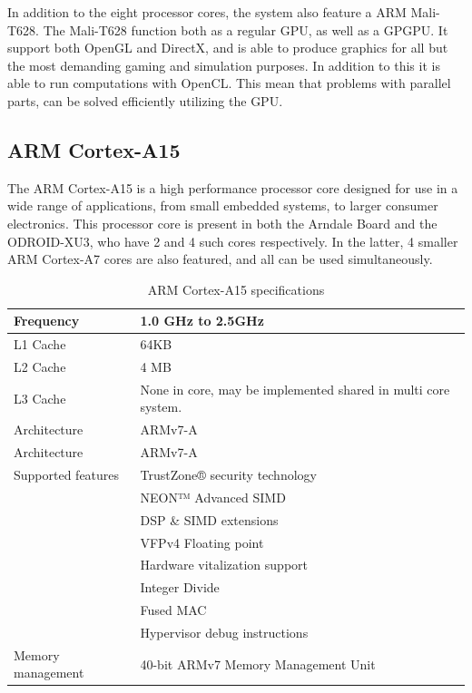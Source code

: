 In addition to the eight processor cores, the system also feature a ARM Mali-T628.
The Mali-T628 function both as a regular GPU, as well as a GPGPU.
It support both OpenGL and DirectX, and is able to produce graphics for all but the most demanding gaming and simulation purposes.
In addition to this it is able to run computations with OpenCL.
This mean that problems with parallel parts, can be solved efficiently utilizing the GPU.

\subsection{ARM Cortex-A15}
The ARM Cortex-A15 is a high performance processor core designed for use in a wide range of applications, from small embedded systems, to larger consumer electronics.
This processor core is present in both the Arndale Board and the ODROID-XU3, who have 2 and 4 such cores respectively.
In the latter, 4 smaller ARM Cortex-A7 cores are also featured, and all can be used simultaneously.
\begin{table}[H]
  \begin{tabular}{ll}
    \toprule
    Frequency         & 1.0 GHz to 2.5GHz  \\
    \midrule
    L1 Cache          & 64KB \\
    L2 Cache          & 4 MB \\
    L3 Cache          & None in core, may be implemented shared in multi core system. \\Architecture      & ARMv7-A            \\
    \midrule
    Architecture      & ARMv7-A            \\
    \midrule
    Supported features& TrustZone® security technology \\
                      & NEON™ Advanced SIMD \\
                      & DSP \& SIMD extensions \\
                      & VFPv4 Floating point \\
                      & Hardware vitalization support \\
                      & Integer Divide \\
                      & Fused MAC \\
                      & Hypervisor debug instructions \\
    \midrule
    Memory management & 40-bit ARMv7 Memory Management Unit \\
    \bottomrule
  \end{tabular}
  \caption{ARM Cortex-A15 specifications\label{overflow}}
\end{table}
